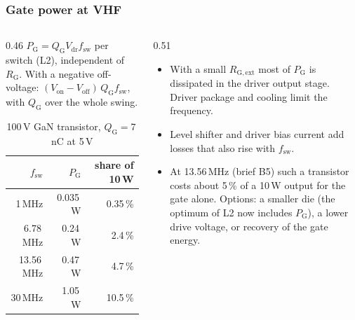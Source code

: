 \begin{frame}
	\frametitle{Gate power at VHF}
	\begin{columns}[T]
		\begin{column}{0.46\textwidth}
			\small
			$P_\mathrm{G}=Q_\mathrm{G}V_\mathrm{dr}f_\mathrm{sw}$ per switch (L2), independent of $R_\mathrm{G}$. With a negative off-voltage: $(V_\mathrm{on}-V_\mathrm{off})\,Q_\mathrm{G}f_\mathrm{sw}$, with $Q_\mathrm{G}$ over the whole swing.
			\begin{table}
				\centering
				\footnotesize
				\begin{tabular}{|r|r|r|}
					\hline
					$f_\mathrm{sw}$ & $P_\mathrm{G}$ & share of 10\,W \\
					\hline
					1\,MHz          & 0.035\,W       & 0.35\,\%       \\
					6.78\,MHz       & 0.24\,W        & 2.4\,\%        \\
					13.56\,MHz      & 0.47\,W        & 4.7\,\%        \\
					30\,MHz         & 1.05\,W        & 10.5\,\%       \\
					\hline
				\end{tabular}
				\caption{100\,V GaN transistor, $Q_\mathrm{G}=7$\,nC at 5\,V}
			\end{table}
		\end{column}
		\begin{column}{0.51\textwidth}
			\small
			\begin{itemize}
				\item With a small $R_\mathrm{G,ext}$ most of $P_\mathrm{G}$ is dissipated in the driver output stage. Driver package and cooling limit the frequency.
				\item Level shifter and driver bias current add losses that also rise with $f_\mathrm{sw}$.
				\item At 13.56\,MHz (brief B5) such a transistor costs about 5\,\% of a 10\,W output for the gate alone. Options: a smaller die (the optimum of L2 now includes $P_\mathrm{G}$), a lower drive voltage, or recovery of the gate energy.
			\end{itemize}
		\end{column}
	\end{columns}
\end{frame}

